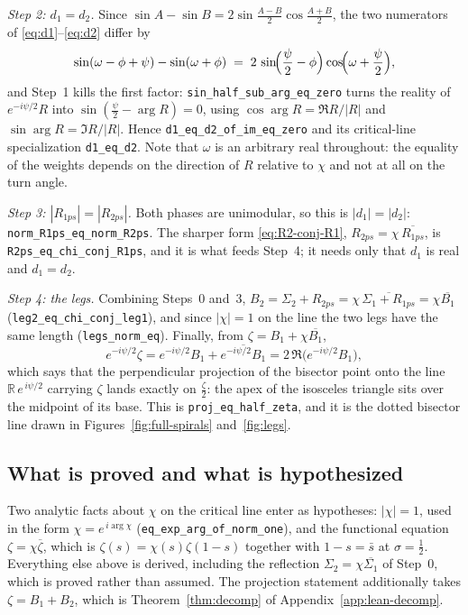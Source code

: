 \documentclass[11pt]{article}
\theoremstyle{definition}
\begin{document}
\emph{Step 2: $d_1=d_2$.} Since $\sin A-\sin B=2\sin\frac{A-B}{2}\cos\frac{A+B}{2}$,
the two numerators of \eqref{eq:d1}--\eqref{eq:d2} differ by
\begin{equation}\label{eq:lean-numerators}
\sin(\omega-\phi+\psi)-\sin(\omega+\phi)
\;=\;
2\,\sin\!\Bigl(\frac{\psi}{2}-\phi\Bigr)\cos\!\Bigl(\omega+\frac{\psi}{2}\Bigr),
\end{equation}
and Step~1 kills the first factor: \texttt{sin\_half\_sub\_arg\_eq\_zero} turns
the reality of $e^{-i\psi/2}R$ into $\sin(\tfrac\psi2-\arg R)=0$, using
$\cos\arg R=\Re R/|R|$ and $\sin\arg R=\Im R/|R|$. Hence
\texttt{d1\_eq\_d2\_of\_im\_eq\_zero} and its critical-line specialization
\texttt{d1\_eq\_d2}. Note that $\omega$ is an arbitrary real throughout: the
equality of the weights depends on the direction of $R$ relative to $\chi$ and
not at all on the turn angle.

\emph{Step 3: $|R_{1ps}|=|R_{2ps}|$.} Both phases are unimodular, so this is
$|d_1|=|d_2|$: \texttt{norm\_R1ps\_eq\_norm\_R2ps}. The sharper form
\eqref{eq:R2-conj-R1}, $R_{2ps}=\chi\,\overline{R_{1ps}}$, is
\texttt{R2ps\_eq\_chi\_conj\_R1ps}, and it is what feeds Step~4; it needs only
that $d_1$ is real and $d_1=d_2$.

\emph{Step 4: the legs.} Combining Steps~0 and~3,
$B_2=\Sigma_2+R_{2ps}=\chi\,\overline{\Sigma_1+R_{1ps}}=\chi\overline{B_1}$
(\texttt{leg2\_eq\_chi\_conj\_leg1}), and since $|\chi|=1$ on the line the two
legs have the same length (\texttt{legs\_norm\_eq}). Finally, from
$\zeta=B_1+\chi\overline{B_1}$,
\begin{equation}\label{eq:lean-proj}
e^{-i\psi/2}\zeta
=e^{-i\psi/2}B_1+\overline{e^{-i\psi/2}B_1}
=2\,\Re\bigl(e^{-i\psi/2}B_1\bigr),
\end{equation}
which says that the perpendicular projection of the bisector point onto the line
$\mathbb{R}\,e^{\,i\psi/2}$ carrying $\zeta$ lands exactly on $\tfrac{\zeta}{2}$:
the apex of the isosceles triangle sits over the midpoint of its base. This is
\texttt{proj\_eq\_half\_zeta}, and it is the dotted bisector line drawn in
Figures~\ref{fig:full-spirals} and~\ref{fig:legs}.

\subsection{What is proved and what is hypothesized}

Two analytic facts about $\chi$ on the critical line enter as hypotheses:
$|\chi|=1$, used in the form $\chi=e^{\,i\arg\chi}$
(\texttt{eq\_exp\_arg\_of\_norm\_one}), and the functional equation
$\zeta=\chi\overline{\zeta}$, which is $\zeta(s)=\chi(s)\zeta(1-s)$ together with
$1-s=\bar s$ at $\sigma=\tfrac12$. Everything else above is derived, including
the reflection $\Sigma_2=\chi\overline{\Sigma_1}$ of Step~0, which is proved
rather than assumed. The projection statement additionally takes
$\zeta=B_1+B_2$, which is Theorem~\ref{thm:decomp} of
Appendix~\ref{app:lean-decomp}.
\end{document}
